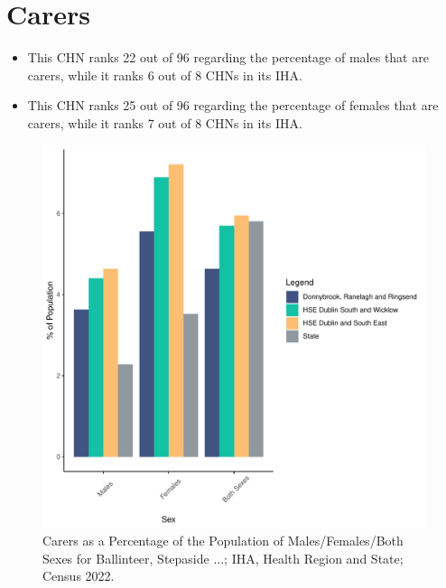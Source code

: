 \documentclass{article}
\begin{document}
\section{Carers}\label{sect:Carers}
\begin{itemize}
\item This CHN ranks  22 out of 96 regarding the percentage of males that are carers, while it ranks   6 out of 8 CHNs in its IHA.
\item This CHN ranks  25 out of 96 regarding the percentage of females that are carers, while it ranks   7 out of 8 CHNs in its IHA.
\end{itemize}
\begin{figure}[H]
	\centering
	\includegraphics[width = 150mm]{../figures/CareED.pdf}
	\caption{Carers as a Percentage of the Population of Males/Females/Both Sexes for Ballinteer, Stepaside ...; IHA, Health Region and State; Census 2022.}
	\label{fig:2ae19629-1a6a-13a3-e055-000000000001}
	\end{figure}
\end{document}

